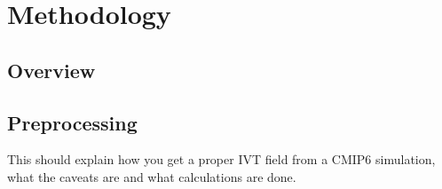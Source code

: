 \chapter{Methodology}
\label{ch:methodology}

\section{Overview}

\section{Preprocessing}

This should explain how you get a proper IVT field from a CMIP6 simulation, what the caveats are and what calculations are done. 




